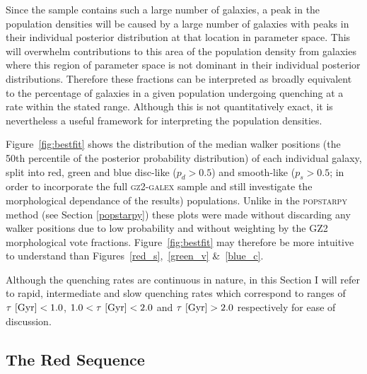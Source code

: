 Since the sample contains such a large number of galaxies, a peak in the population densities will be caused by a large number of galaxies with peaks in their individual posterior distribution at that location in parameter space. This will overwhelm contributions to this area of the population density from galaxies where this region of parameter space is not dominant in their individual posterior distributions. Therefore these fractions can be interpreted as broadly equivalent to the percentage of galaxies in a given population undergoing quenching at a rate within the stated range. Although this is not quantitatively exact, it is nevertheless a useful framework for interpreting the population densities.

Figure~\ref{fig:bestfit} shows the distribution of the median walker positions (the 50th percentile of the posterior probability distribution) of each individual galaxy, split into red, green and blue disc-like ($p_d > 0.5$) and smooth-like ($p_s > 0.5$; in order to incorporate the full \textsc{gz2-galex} sample and still investigate the morphological dependance of the results) populations. Unlike in the \textsc{popstarpy} method (see Section \ref{popstarpy}) these plots were made without discarding any walker positions due to low probability and without weighting by the GZ2 morphological vote fractions. Figure~\ref{fig:bestfit} may therefore be more intuitive to understand than Figures~\ref{red_s},~\ref{green_v} \&~\ref{blue_c}.

Although the quenching rates are continuous in nature, in this Section I will refer to rapid, intermediate and slow quenching rates which correspond to ranges of  $\tau ~\rm{[Gyr]} < 1.0$, $1.0 < \tau ~\rm{[Gyr]} < 2.0$ and $\tau ~\rm{[Gyr]} > 2.0$ respectively for ease of discussion.



\subsection{The Red Sequence}\label{rs}

